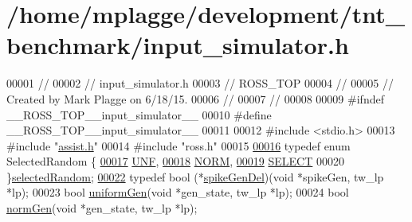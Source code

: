 \hypertarget{input__simulator_8h_source}{}\section{/home/mplagge/development/tnt\+\_\+benchmark/input\+\_\+simulator.h}

\begin{DoxyCode}
00001 \textcolor{comment}{//}
00002 \textcolor{comment}{//  input\_simulator.h}
00003 \textcolor{comment}{//  ROSS\_TOP}
00004 \textcolor{comment}{//}
00005 \textcolor{comment}{//  Created by Mark Plagge on 6/18/15.}
00006 \textcolor{comment}{//}
00007 \textcolor{comment}{//}
00008 
00009 \textcolor{preprocessor}{#ifndef \_\_ROSS\_TOP\_\_input\_simulator\_\_}
00010 \textcolor{preprocessor}{#define \_\_ROSS\_TOP\_\_input\_simulator\_\_}
00011 
00012 \textcolor{preprocessor}{#include <stdio.h>}
00013 \textcolor{preprocessor}{#include "\hyperlink{assist_8h}{assist.h}"}
00014 \textcolor{preprocessor}{#include "ross.h"}
00015 
\hypertarget{input__simulator_8h_source_l00016}{}\hyperlink{input__simulator_8h_aa0d25534cd73156287b1136dd89c0215}{00016} \textcolor{keyword}{typedef} \textcolor{keyword}{enum} SelectedRandom \{
\hypertarget{input__simulator_8h_source_l00017}{}\hyperlink{input__simulator_8h_aa0d25534cd73156287b1136dd89c0215a4b3574e75cec43aa4dd3a0fd7940c632}{00017}     \hyperlink{input__simulator_8h_aa0d25534cd73156287b1136dd89c0215a4b3574e75cec43aa4dd3a0fd7940c632}{UNF},
\hypertarget{input__simulator_8h_source_l00018}{}\hyperlink{input__simulator_8h_aa0d25534cd73156287b1136dd89c0215ae003ec1158e3a4e295616ced12af154e}{00018}     \hyperlink{input__simulator_8h_aa0d25534cd73156287b1136dd89c0215ae003ec1158e3a4e295616ced12af154e}{NORM},
\hypertarget{input__simulator_8h_source_l00019}{}\hyperlink{input__simulator_8h_aa0d25534cd73156287b1136dd89c0215a1697a91b22c2369eb2ba427c2d193329}{00019}     \hyperlink{input__simulator_8h_aa0d25534cd73156287b1136dd89c0215a1697a91b22c2369eb2ba427c2d193329}{SELECT}
00020 \}\hyperlink{input__simulator_8h_aa0d25534cd73156287b1136dd89c0215}{selectedRandom};
\hypertarget{input__simulator_8h_source_l00022}{}\hyperlink{input__simulator_8h_aa47e87d309aab7727810011578bae86e}{00022} \textcolor{keyword}{typedef} bool (*\hyperlink{input__simulator_8h_aa47e87d309aab7727810011578bae86e}{spikeGenDel})(\textcolor{keywordtype}{void} *spikeGen, tw\_lp *lp);
00023 \textcolor{keywordtype}{bool} \hyperlink{input__simulator_8h_ad6244e86a3542f8d3c64766e7e7c6746}{uniformGen}(\textcolor{keywordtype}{void} *gen\_state, tw\_lp *lp);
00024 \textcolor{keywordtype}{bool} \hyperlink{input__simulator_8h_a7a9db804782d8a0c810fa90ae9c2dd05}{normGen}(\textcolor{keywordtype}{void} *gen\_state, tw\_lp *lp);

\end{DoxyCode}
